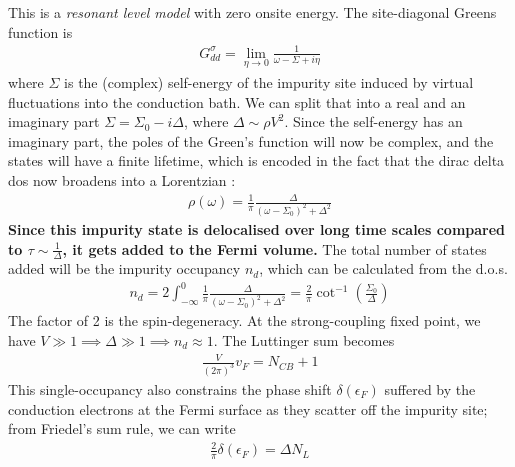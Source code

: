 \documentclass[12pt,twoside]{article}
\numberwithin{equation}{section}
\begin{document}
{This is a \textit{resonant level model} with zero onsite energy. The site-diagonal Greens function is
\begin{equation}\begin{aligned}
	G_{dd}^\sigma = \lim_{\eta \to 0}\frac{1}{\omega -\Sigma + i\eta }
\end{aligned}\end{equation}
where \(\Sigma\) is the (complex) self-energy of the impurity site induced by virtual fluctuations into the conduction bath. We can split that into a real and an imaginary part \(\Sigma = \Sigma_0 - i\Delta\), where \(\Delta \sim \rho V^2\). Since the self-energy has an imaginary part, the poles of the Green's function will now be complex, and the states will have a finite lifetime, which is encoded in the fact that the dirac delta dos now broadens into a Lorentzian :
\begin{equation}\begin{aligned}
	\rho (\omega) = \frac{1}{\pi}\frac{\Delta}{\left( \omega - \Sigma_0 \right) ^2 + \Delta^2}
\end{aligned}\end{equation}
\textbf{Since this impurity state is delocalised over long time scales compared to \(\tau \sim \frac{1}{\Delta}\), it gets added to the Fermi volume.} The total number of states added will be the impurity occupancy \(n_d\), which can be calculated from the d.o.s. 
\begin{equation}\begin{aligned}
	n_d = 2\int_{-\infty}^0 \frac{1}{\pi}\frac{\Delta}{\left(\omega - \Sigma_0 \right)^2 + \Delta^2} = \frac{2}{\pi} \cot^{-1} \left(\frac{\Sigma_0}{\Delta} \right)
\end{aligned}\end{equation}
The factor of 2 is the spin-degeneracy. At the strong-coupling fixed point, we have \(V \gg 1 \implies \Delta \gg 1 \implies n_d \approx 1\). The Luttinger sum becomes
\begin{equation}\begin{aligned}
	\frac{V}{\left( 2\pi \right) ^3}v_F = N_{CB} + 1
\end{aligned}\end{equation}
This single-occupancy also constrains the phase shift \(\delta(\epsilon_F)\) suffered by the conduction electrons at the Fermi surface as they scatter off the impurity site; from Friedel's sum rule, we can write
\begin{equation}\begin{aligned}
	\frac{2}{\pi}\delta(\epsilon_F) = \Delta N_L

\end{aligned}
\end{equation}}
\end{document}
